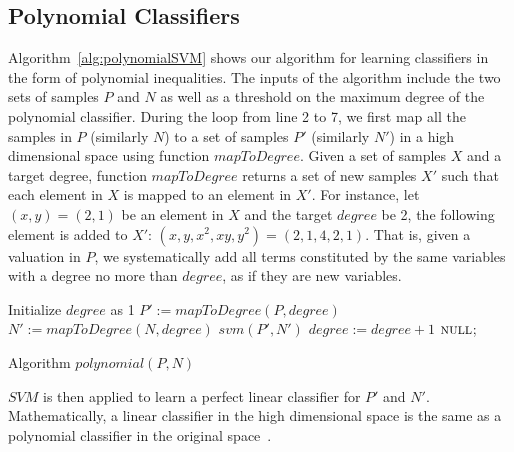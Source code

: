 \subsection{Polynomial Classifiers} Algorithm~\ref{alg:polynomialSVM} shows our algorithm for learning classifiers in the form of polynomial inequalities.
The inputs of the algorithm include the two sets of samples $P$ and $N$ as well as a threshold on the maximum degree of the polynomial classifier.
During the loop from line 2 to 7, we first map all the samples in $P$ (similarly $N$) to a set of samples $P'$ (similarly $N'$) in a high dimensional space using function $\mathit{mapToDegree}$.
Given a set of samples $X$ and a target degree, function $\mathit{mapToDegree}$ returns a set of new samples $X'$ such that each element in $X$ is mapped to an element in $X'$.
For instance, let ${(x, y) =  (2, 1)}$ be an element in $X$ and the target $\mathit{degree}$ be 2,
the following element is added to $X'$: ${(x, y, x^2, xy, y^2) =  (2, 1, 4, 2, 1)}$.
That is, given a valuation in $P$, we systematically add all terms constituted by the same variables with a degree no more than $\mathit{degree}$,
as if they are new variables.
\begin{algorithm}[t]
\SetAlgoVlined
\Indm
\Indp
    Initialize $degree$ as 1\;
     {
        $P' := \mathit{mapToDegree}(P, \mathit{degree})$\;
        $N' := \mathit{mapToDegree}(N, \mathit{degree})$\;
         {
            \Return $\mathit{svm}(P', N')$\;
        }
        $\mathit{degree} := \mathit{degree} + 1$\;
    }
    \Return $\textsc{null}$;
\caption{Algorithm $\mathit{polynomial}(P,N)$}
\label{alg:polynomialSVM}
\end{algorithm}
$\mathit{SVM}$ is then applied to learn a perfect linear classifier for $P'$ and $N'$. %
Mathematically, a linear classifier in the high dimensional space is the same as a polynomial classifier in the original space~\cite{svm:kernel}.

